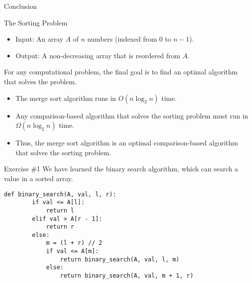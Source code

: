 \documentclass{beamer}
\begin{document}
\begin{frame}{Conclusion}
  \begin{block}{The Sorting Problem}
    \begin{itemize}
      \item Input: An array $A$ of $n$ numbers (indexed from $0$ to $n-1$).
      \item Output: A non-decreasing array that is reordered from $A$.
    \end{itemize}
  \end{block}
  For any computational problem, the final goal is to find an optimal algorithm
  that solves the problem. \pause
  \begin{itemize}
    \item The merge sort algorithm runs in $O(n \log_2 n)$ time. \pause
    \item Any comparison-based algorithm that solves the sorting problem must
    run in $\Omega(n \log_2 n)$ time. \pause
    \item Thus, the merge sort algorithm is an optimal comparison-based
    algorithm that solves the sorting problem.
  \end{itemize}
\end{frame}

\begin{frame}[fragile]{Exercise \#1}
  We have learned the binary search algorithm, which can search a value in a
  sorted array. \pause
  \begin{block}{}
    \scriptsize
    \begin{lstlisting}[gobble=4]
    def binary_search(A, val, l, r):
        if val <= A[l]:
            return l
        elif val > A[r - 1]:
            return r
        else:
            m = (l + r) // 2
            if val <= A[m]:
                return binary_search(A, val, l, m)
            else:
                return binary_search(A, val, m + 1, r)
    \end{lstlisting}
  \end{block}
\end{frame}
\end{document}
